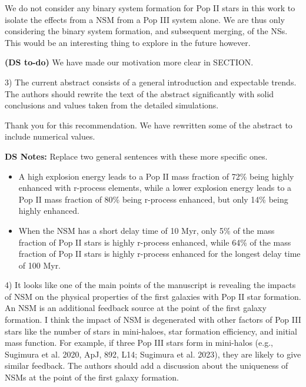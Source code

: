 \documentclass[11pt]{article}
\begin{document}
We do not consider any binary system formation for Pop II stars in this work to isolate the effects from a NSM from a Pop III system alone. We are thus only considering the binary system formation, and subsequent merging, of the NSs. This would be an interesting thing to explore in the future however.

\textbf{(DS to-do)} We have made our motivation more clear in SECTION.

\begin{tcolorbox}[colback={lightgray}]
    3)      The current abstract consists of a general introduction and expectable trends. The authors should rewrite the text of the abstract significantly with solid conclusions and values taken from the detailed simulations.
\end{tcolorbox}

Thank you for this recommendation. We have rewritten some of the abstract to include numerical values. 

\textbf{DS Notes:}
Replace two general sentences with these more specific ones.
\begin{itemize}
    \item A high explosion energy leads to a Pop II mass fraction of 72\% being highly enhanced with r-process elements, while a lower explosion energy leads to a Pop II mass fraction of 80\% being r-process enhanced, but only 14\% being highly enhanced.
    \item When the NSM has a short delay time of 10 Myr, only 5\% of the mass fraction of Pop II stars is highly r-process enhanced, while 64\% of the mass fraction of Pop II stars is highly r-process enhanced for the longest delay time of 100 Myr. 
\end{itemize}

\begin{tcolorbox}[colback={lightgray}]
    4)      It looks like one of the main points of the manuscript is revealing the impacts of NSM on the physical properties of the first galaxies with Pop II star formation. An NSM is an additional feedback source at the point of the first galaxy formation. I think the impact of NSM is degenerated with other factors of Pop III stars like the number of stars in mini-haloes, star formation efficiency, and initial mass function. For example, if three Pop III stars form in mini-halos (e.g., Sugimura et al. 2020, ApJ, 892, L14; Sugimura et al. 2023), they are likely to give similar feedback. The authors should add a discussion about the uniqueness of NSMs at the point of the first galaxy formation.
\end{tcolorbox}
\end{document}
